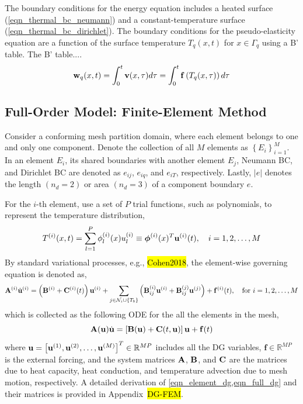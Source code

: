 The boundary conditions for the energy equation includes a heated surface (\cref{eqn_thermal_bc_neumann}) and a constant-temperature surface (\cref{eqn_thermal_bc_dirichlet}). The boundary conditions for the pseudo-elasticity equation are a function of the surface temperature $T_q(x,t)$ for $x\in\Gamma_q$ using a B' table. The B' table....
\begin{equation}
    \mathbf{w}_q(x,t) = \int_{0}^{t} \mathbf{v}(x,\tau)d\tau = \int_{0}^{t}\mathbf{f}\left(T_q(x,\tau)\right)d\tau\label{eqn_boundary_displacement}
\end{equation}

\subsection{Full-Order Model: Finite-Element Method}\label{sec_fom}

Consider a conforming mesh partition domain, where each element belongs to one and only one component. Denote the collection of all $M$ elements as $\left\{E_i\right\}_{i=1}^{M}$. In an element $E_i$, its shared boundaries with another element $E_j$, Neumann BC, and Dirichlet BC are denoted as $e_{ij}$, $e_{iq}$, and $e_{iT}$, respectively. Lastly, $\left|e\right|$ denotes the length $(n_d=2)$ or area $(n_d=3)$ of a component boundary $e$.

For the $i$-th element, use a set of $P$ trial functions, such as polynomials, to represent the temperature distribution,
\begin{equation}
    T^{(i)}(x,t) = \sum_{l=1}^{P} \phi_l^{(i)}(x)u_l^{(i)} \equiv \boldsymbol{\phi}^{(i)}(x)^T\mathbf{u}^{(i)}(t),\quad i=1,2,\dots,M\label{eqn_element_temperature}
\end{equation}
By standard variational processes, e.g., \hl{Cohen2018}, the element-wise governing equation is denoted as,
\begin{equation}
    \mathbf{A}^{(i)}\dot{\mathbf{u}}^{(i)} = \left(\mathbf{B}^{(i)} + \mathbf{C}^{(i)}(t)\right)\mathbf{u}^{(i)} + \sum_{j\in\mathcal{N}_i\cup\left\{T_b\right\}}\left(\mathbf{B}^{(i)}_{ij}\mathbf{u}^{(i)} + \mathbf{B}^{(j)}_{ij}\mathbf{u}^{(j)}\right) + \mathbf{f}^{(i)}(t),\quad\text{for }i=1,2,\dots,M\label{eqn_element_dg}
\end{equation}
which is collected as the following ODE for the all the elements in the mesh,
\begin{equation}
    \mathbf{A}(\mathbf{u})\dot{\mathbf{u}} = \left[\mathbf{B}(\mathbf{u}) + \mathbf{C}(t,\mathbf{u})\right]\mathbf{u} + \mathbf{f}(t)\label{eqn_full_dg}
\end{equation}
where $\mathbf{u} = \left[\mathbf{u}^{(1)}, \mathbf{u}^{(2)}, \ldots, \mathbf{u}^{(M)}\right]^T\in\mathbb{R}^{MP}$ includes all the DG variables, $\mathbf{f}\in\mathbb{R}^{MP}$ is the external forcing, and the system matrices $\mathbf{A}$, $\mathbf{B}$, and $\mathbf{C}$ are the matrices due to heat capacity, heat conduction, and temperature advection due to mesh motion, respectively. A detailed derivation of \cref{eqn_element_dg,eqn_full_dg} and their matrices is provided in Appendix~\hl{DG-FEM}.

